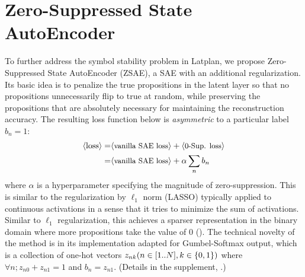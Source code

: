 \section{Zero-Suppressed State AutoEncoder}
\label{zsae}


To further address the symbol stability problem in Latplan,
we propose Zero-Suppressed State AutoEncoder (ZSAE),
a SAE with an additional regularization.
% 
Its basic idea is to penalize the
true propositions in the latent layer so that no propositions unnecessarily flip to true at random,
while preserving the propositions that are absolutely necessary for maintaining the reconstruction accuracy.
% 
The resulting loss function below is 
\emph{asymmetric} to a particular label $b_n=1$:
\begin{align*}
 \brackets{\text{loss}} = & \brackets{\text{\small vanilla SAE loss}} + \brackets{\text{\small 0-Sup. loss}} \\ 
 =                        & \brackets{\text{\small vanilla SAE loss}} + \alpha \sum_n b_n %
\end{align*}
where $\alpha$ is a hyperparameter specifying the magnitude of zero-suppression.
This is similar to the regularization by $\ell_1$ norm (LASSO) typically applied to continuous activations
in a sense that it tries to minimize the sum of activations.
Similar to $\ell_1$ regularization, this achieves a sparser representation in the binary domain where
more propositions take the value of 0 ().
The technical novelty of the method is in its implementation adapted for Gumbel-Softmax output,
which is a collection of one-hot vectors $z_{nk} (n\in [1..N], k\in {\left\{0,1\right\}})$
where $\forall n; z_{n0} + z_{n1} = 1$ and  $b_n = z_{n1}$.
(Details in the supplement, .)

